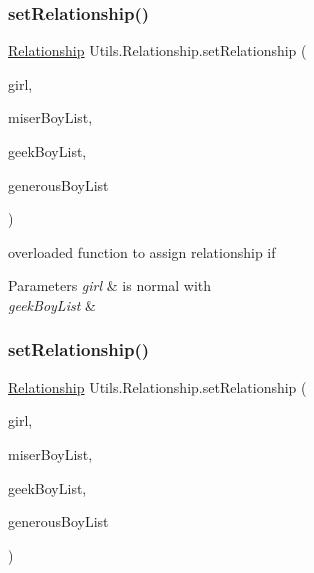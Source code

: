 \subsubsection{\texorpdfstring{set\+Relationship()}{setRelationship()}\hspace{0.1cm}{\footnotesize\ttfamily [2/3]}}
{\footnotesize\ttfamily \hyperlink{class_utils_1_1_relationship}{Relationship} Utils.\+Relationship.\+set\+Relationship (\begin{DoxyParamCaption}\item[{\hyperlink{class_girls_1_1_normal_girl}{Normal\+Girl}}]{girl,  }\item[{Array\+List$<$ \hyperlink{class_boys_1_1_miser_boy}{Miser\+Boy} $>$}]{miser\+Boy\+List,  }\item[{Array\+List$<$ \hyperlink{class_boys_1_1_geek_boy}{Geek\+Boy} $>$}]{geek\+Boy\+List,  }\item[{Array\+List$<$ \hyperlink{class_boys_1_1_generous_boy}{Generous\+Boy} $>$}]{generous\+Boy\+List }\end{DoxyParamCaption})\hspace{0.3cm}{\ttfamily [inline]}}

overloaded function to assign relationship if 
\begin{DoxyParams}{Parameters}
{\em girl} & is normal with \\
\hline
{\em geek\+Boy\+List} & \\
\hline
\end{DoxyParams}
\mbox{\label{class_utils_1_1_relationship_a5cf184082475c519dbc00ab52d097f6f}} 
\subsubsection{\texorpdfstring{set\+Relationship()}{setRelationship()}\hspace{0.1cm}{\footnotesize\ttfamily [3/3]}}
{\footnotesize\ttfamily \hyperlink{class_utils_1_1_relationship}{Relationship} Utils.\+Relationship.\+set\+Relationship (\begin{DoxyParamCaption}\item[{\hyperlink{class_girls_1_1_desperate_girl}{Desperate\+Girl}}]{girl,  }\item[{Array\+List$<$ \hyperlink{class_boys_1_1_miser_boy}{Miser\+Boy} $>$}]{miser\+Boy\+List,  }\item[{Array\+List$<$ \hyperlink{class_boys_1_1_geek_boy}{Geek\+Boy} $>$}]{geek\+Boy\+List,  }\item[{Array\+List$<$ \hyperlink{class_boys_1_1_generous_boy}{Generous\+Boy} $>$}]{generous\+Boy\+List }\end{DoxyParamCaption})\hspace{0.3cm}{\ttfamily [inline]}}

